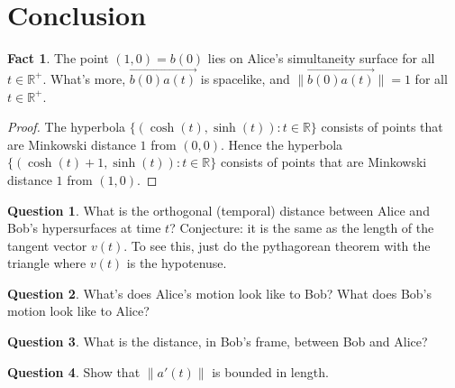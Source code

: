 \documentclass[tikz,border=10pt,fleqn]{article}
\theoremstyle{definition}
\newtheorem*{question}{Question}
\newtheorem*{fact}{Fact}
\newcommand{\vecc}[1]{\overrightarrow{#1}}
\begin{document}



\section{Conclusion}

\begin{fact} The point $(1,0)=b(0)$ lies on Alice's simultaneity
  surface for all $t\in\mathbb{R}^+$. What's more, $\vecc{b(0)a(t)}$
  is spacelike, and $\| \vecc{b(0)a(t)}\| =1$ for all
  $t\in\mathbb{R}^+$. \end{fact}

\begin{proof} The hyperbola
  $\{ (\cosh (t),\sinh(t)):t\in\mathbb{R} \}$ consists of points that
  are Minkowski distance $1$ from $(0,0)$. Hence the hyperbola
  $\{ (\cosh (t)+1,\sinh (t)):t\in\mathbb{R}\}$ consists of points
  that are Minkowski distance $1$ from $(1,0)$.
\end{proof}


\begin{question} What is the orthogonal (temporal) distance between
  Alice and Bob's hypersurfaces at time $t$? Conjecture: it is the
  same as the length of the tangent vector $v(t)$. To see this, just
  do the pythagorean theorem with the triangle where $v(t)$ is the
  hypotenuse. \end{question}

\begin{question} What's does Alice's motion look like to Bob? What
  does Bob's motion look like to Alice? \end{question}

\begin{question} What is the distance, in Bob's frame, between Bob and
  Alice? \end{question}

\begin{question} Show that $\| a'(t)\|$ is bounded in
  length. \end{question}

\printbibliography 
\end{document}
